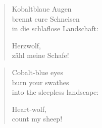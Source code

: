 
\cleartoverso


\begin{verse}
Kobaltblaue Augen\\
brennt eure Schneisen\\
in die schlaflose Landschaft:

Herzwolf,\\
zähl meine Schafe!
\end{verse}

\cleartorecto


\begin{verse}
Cobalt-blue eyes\\
burn your swathes\\
into the sleepless landscape:

Heart-wolf,\\
count my sheep!
\end{verse}

